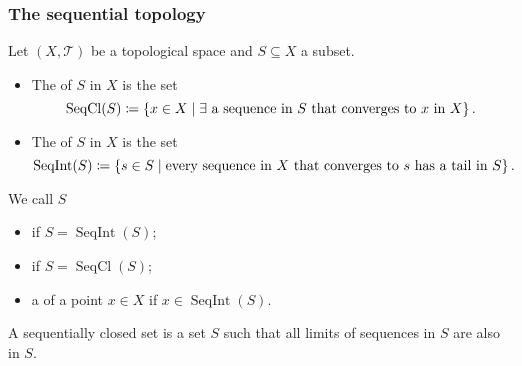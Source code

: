 \subsubsection{The sequential topology}
\begin{definition}
Let $(X,\mathcal{T})$ be a topological space and $S\subseteq X$ a subset.
\begin{itemize}
\item The  of $S$ in $X$ is the set
\[ \operatorname{SeqCl}(S) \coloneqq \left\{ x\in X \;\middle|\; \text{$\exists$ a sequence in $S$ that converges to $x$ in $X$} \right\}. \]
\item The  of $S$ in $X$ is the set
\[ \operatorname{SeqInt}(S) \coloneqq \left\{ s\in S \;\middle|\; \text{every sequence in $X$ that converges to $s$ has a tail in $S$} \right\}. \]
\end{itemize}
We call $S$
\begin{itemize}
\item {} if $S = \operatorname{SeqInt}(S)$;
\item {} if $S = \operatorname{SeqCl}(S)$;
\item a  of a point $x\in X$ if $x\in \operatorname{SeqInt}(S)$.
\end{itemize}
\end{definition}
A sequentially closed set is a set $S$ such that all limits of sequences in $S$ are also in $S$.

